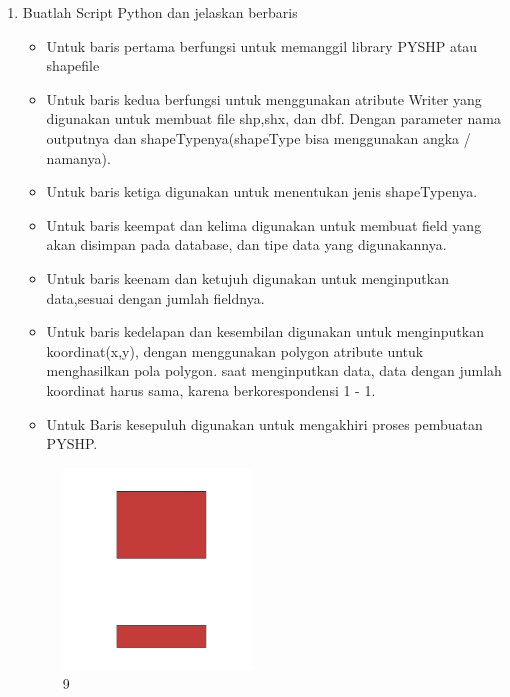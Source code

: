\begin{enumerate}
	\item Buatlah Script Python dan jelaskan berbaris
	
	\begin{itemize}
		\item Untuk baris pertama berfungsi untuk memanggil library PYSHP atau shapefile
		\item Untuk baris kedua berfungsi untuk menggunakan atribute Writer yang digunakan untuk membuat file shp,shx, dan dbf. \hfill\break Dengan parameter nama outputnya dan shapeTypenya(shapeType bisa menggunakan angka / namanya).
		\item Untuk baris ketiga digunakan untuk menentukan jenis shapeTypenya.
		\item Untuk baris keempat dan kelima digunakan untuk membuat field yang akan disimpan pada database, dan tipe data yang digunakannya.
		\item Untuk baris keenam dan ketujuh digunakan untuk menginputkan data,sesuai dengan jumlah fieldnya.
		\item Untuk baris kedelapan dan kesembilan digunakan untuk menginputkan koordinat(x,y), dengan menggunakan polygon atribute untuk menghasilkan pola polygon. \hfill\break
		saat menginputkan data, data dengan jumlah koordinat harus sama, karena berkorespondensi 1 - 1.
		\item Untuk Baris kesepuluh digunakan untuk mengakhiri proses pembuatan PYSHP.
	\end{itemize}
	\hfill\break
	\begin{figure}[H]
		\includegraphics[width=5cm]{figures/1174009/2/9.png}
		\centering
		\caption{9}
	\end{figure}


\end{enumerate}
